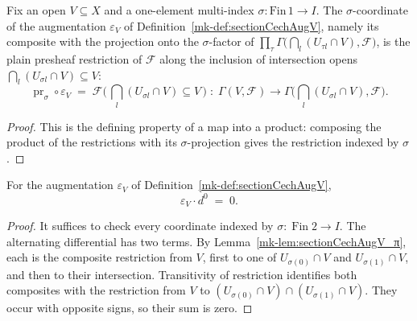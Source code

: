 \begin{lemma}
  \label{mk-lem:sectionCechAugV_π}
  \leanok

  Fix an open \(V \subseteq X\) and a one-element multi-index \(\sigma : \mathrm{Fin}\,1 \to I\).
  The \(\sigma\)-coordinate of the augmentation \(\varepsilon_V\) of
  Definition~\ref{mk-def:sectionCechAugV}, namely its composite with the projection onto the
  \(\sigma\)-factor of
  \(\prod_\tau \Gamma\bigl(\bigcap_l(U_{\tau l}\cap V),\mathcal{F}\bigr)\), is the plain presheaf
  restriction of \(\mathcal{F}\) along the inclusion of intersection opens
  \(\bigcap_l(U_{\sigma l}\cap V) \subseteq V\):
  \[
    \operatorname{pr}_{\sigma}\circ\varepsilon_V
      \;=\;
    \mathcal{F}\bigl(\,\textstyle\bigcap_l(U_{\sigma l}\cap V)\subseteq V\,\bigr)
      \;:\; \Gamma(V,\mathcal{F}) \longrightarrow
      \Gamma\bigl(\textstyle\bigcap_l(U_{\sigma l}\cap V),\mathcal{F}\bigr).
  \]
\end{lemma}
\begin{proof}
  \leanok
  This is the defining property of a map into a product: composing the product of the
  restrictions with its \(\sigma\)-projection gives the restriction indexed by \(\sigma\).
\end{proof}

\begin{lemma}\label{mk-lem:sectionCechAugV_comp_d}
  \leanok

  For the augmentation \(\varepsilon_V\) of Definition~\ref{mk-def:sectionCechAugV},
  \[
    \varepsilon_V \cdot d^0 \;=\; 0.
  \]
\end{lemma}
\begin{proof}
  \leanok
  It suffices to check every coordinate indexed by \(\sigma:\operatorname{Fin}2\to I\).
  The alternating differential has two terms. By
  Lemma~\ref{mk-lem:sectionCechAugV_π}, each is the composite restriction from \(V\), first to one
  of \(U_{\sigma(0)}\cap V\) and \(U_{\sigma(1)}\cap V\), and then to their intersection.
  Transitivity of restriction identifies both composites with the restriction from \(V\) to
  \((U_{\sigma(0)}\cap V)\cap(U_{\sigma(1)}\cap V)\). They occur with opposite signs, so their
  sum is zero.
\end{proof}

